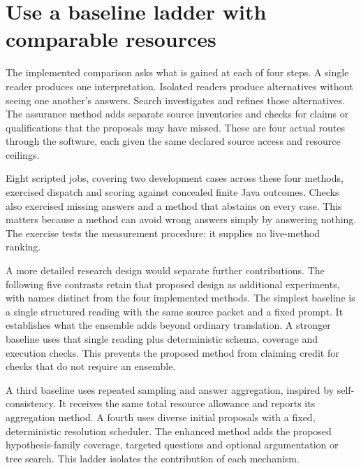 \documentclass[12pt,a4paper,oneside,openany]{book}
\begin{document}
\section{Use a baseline ladder with comparable resources}
\label{merge:M09:04}


The implemented comparison asks what is gained at each of four steps. A single
reader produces one interpretation. Isolated readers produce alternatives
without seeing one another's answers. Search investigates and refines those
alternatives. The assurance method adds separate source inventories and checks
for claims or qualifications that the proposals may have missed. These are four
actual routes through the software, each given the same declared source access
and resource ceilings.

Eight scripted jobs, covering two development cases across these four methods,
exercised dispatch and scoring against concealed finite Java outcomes. Checks
also exercised missing answers and a method that abstains on every case. This
matters because a method can avoid wrong answers simply by answering nothing.
The exercise tests the measurement procedure; it supplies no live-method ranking.

A more detailed research design would separate further contributions. The
following five contrasts retain that proposed design as additional experiments,
with names distinct from the four implemented methods. The simplest baseline
is a single structured reading with the same source packet
and a fixed prompt. It establishes what the ensemble adds beyond ordinary
translation. A stronger baseline uses that single reading plus deterministic
schema, coverage and execution checks. This prevents the proposed method from
claiming credit for checks that do not require an ensemble.

A third baseline uses repeated sampling and answer aggregation, inspired by
self-consistency. It receives the same total resource allowance and reports its
aggregation method. A fourth uses diverse initial proposals with a fixed,
deterministic resolution scheduler. The enhanced method adds the proposed
hypothesis-family coverage, targeted questions and optional argumentation or tree
search. This ladder isolates the contribution of each mechanism.
\end{document}
